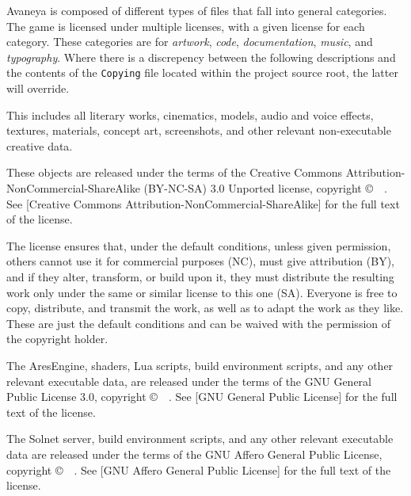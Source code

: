 

Avaneya is composed of different types of files that fall into general categories. The game is licensed under multiple licenses, with a given license for each category. These categories are for {\it artwork}, {\it code}, {\it documentation}, {\it music}, and {\it typography}. Where there is a discrepency between the following descriptions and the contents of the {\tt Copying} file located within the project source root, the latter will override.

\startitemize[4]

This includes all literary works, cinematics, models, audio and voice effects, textures, materials, concept art, screenshots, and other relevant non-executable creative data. 

These objects are released under the terms of the Creative Commons Attribution-NonCommercial-ShareAlike (BY-NC-SA) 3.0 Unported license, copyright \copyright\ \CopyrightDates\ \CopyrightHolder. See [Creative Commons Attribution-NonCommercial-ShareAlike] for the full text of the license.

The license ensures that, under the default conditions, unless given permission, others cannot use it for commercial purposes (NC), must give attribution (BY), and if they alter, transform, or build upon it, they must distribute the resulting work only under the same or similar license to this one (SA). Everyone is free to copy, distribute, and transmit the work, as well as to adapt the work as they like. These are just the default conditions and can be waived with the permission of the copyright holder.


The AresEngine, shaders, Lua scripts, build environment scripts, and any other relevant executable data, are released under the terms of the GNU General Public License 3.0, copyright \copyright\ \CopyrightDates\ \CopyrightHolder. See [GNU General Public License] for the full text of the license.

The Solnet server, build environment scripts, and any other relevant executable data are released under the terms of the GNU Affero General Public License, copyright \copyright\ \CopyrightDates\ \CopyrightHolder. See [GNU Affero General Public License] for the full text of the license.

